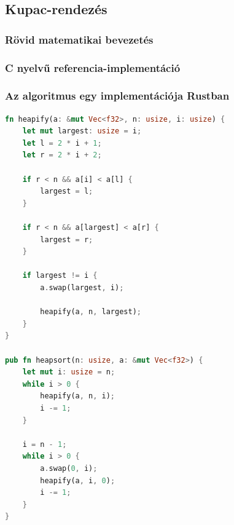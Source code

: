 \subsection{Kupac-rendezés}

\subsubsection{Rövid matematikai bevezetés}

\subsubsection{C nyelvű referencia-implementáció}


\subsubsection{Az algoritmus egy implementációja Rustban}
\begin{lstlisting}[language=Rust]
fn heapify(a: &mut Vec<f32>, n: usize, i: usize) {
	let mut largest: usize = i;
	let l = 2 * i + 1;
	let r = 2 * i + 2;
	
	if r < n && a[i] < a[l] {
		largest = l;
	}
	
	if r < n && a[largest] < a[r] {
		largest = r;
	}
	
	if largest != i {
		a.swap(largest, i);
		
		heapify(a, n, largest);
	}
}

pub fn heapsort(n: usize, a: &mut Vec<f32>) {
	let mut i: usize = n;
	while i > 0 {
		heapify(a, n, i);
		i -= 1;
	}

	i = n - 1;
	while i > 0 {
		a.swap(0, i);
		heapify(a, i, 0);
		i -= 1;
	}
}
\end{lstlisting}

